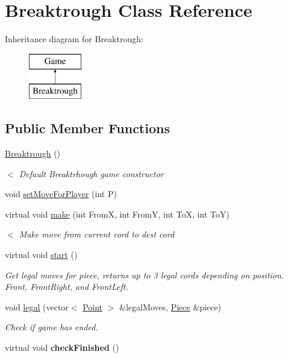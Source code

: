 \hypertarget{class_breaktrough}{\section{Breaktrough Class Reference}
\label{class_breaktrough}
}
Inheritance diagram for Breaktrough\-:\begin{figure}[H]
\begin{center}
\leavevmode
\includegraphics[height=2.000000cm]{class_breaktrough}
\end{center}
\end{figure}
\subsection*{Public Member Functions}
\begin{DoxyCompactItemize}
\item 
\hyperlink{class_breaktrough_a988083f0722bff1058a980748c65705f}{Breaktrough} ()
\begin{DoxyCompactList}\small\item\em $<$ Default Breaktrhough game constructor \end{DoxyCompactList}\item 
void \hyperlink{class_breaktrough_a1e1244669a6ab63043329afcdaaeec37}{set\-Move\-For\-Player} (int P)
\item 
virtual void \hyperlink{class_breaktrough_a07006aa5d9919ddefa68554f3022afc6}{make} (int From\-X, int From\-Y, int To\-X, int To\-Y)
\begin{DoxyCompactList}\small\item\em $<$ Make move from current cord to dest cord \end{DoxyCompactList}\item 
\hypertarget{class_breaktrough_a1e4b2c80e074f7052c4c491abe95c9f6}{virtual void \hyperlink{class_breaktrough_a1e4b2c80e074f7052c4c491abe95c9f6}{start} ()}\label{class_breaktrough_a1e4b2c80e074f7052c4c491abe95c9f6}

\begin{DoxyCompactList}\small\item\em Get legal moves for piece, returns up to 3 legal cords depending on position. Front, Front\-Right, and Front\-Left. \end{DoxyCompactList}\item 
void \hyperlink{class_breaktrough_a6bf5d444ace61244df9a0255fde5d533}{legal} (vector$<$ \hyperlink{struct_point}{Point} $>$ \&legal\-Moves, \hyperlink{class_piece}{Piece} \&piece)
\begin{DoxyCompactList}\small\item\em Check if game has ended. \end{DoxyCompactList}\item 
\hypertarget{class_breaktrough_ae9e5edbac2c2fcce47711697eb3a8a2d}{virtual void {\bfseries check\-Finished} ()}\label{class_breaktrough_ae9e5edbac2c2fcce47711697eb3a8a2d}

\end{DoxyCompactItemize}
